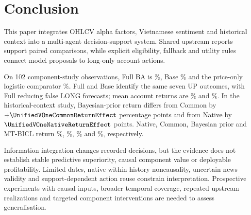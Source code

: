 \section{Conclusion}
\label{sec:conclusion}

This paper integrates OHLCV alpha factors, Vietnamese sentiment and historical context into a multi-agent decision-support system. Shared upstream reports support paired comparisons, while explicit eligibility, fallback and utility rules connect model proposals to long-only account actions.

On 102 component-study observations, Full BA is \FullBA\%, Base \BaseBA\% and the price-only logistic comparator \LogisticPriceBA\%. Full and Base identify the same seven UP outcomes, with Full reducing false LONG forecasts; mean account returns are \FullReturn\% and \BaseReturn\%. In the historical-context study, Bayesian-prior return differs from Common by $+\UnifiedVOneCommonReturnEffect$ percentage points and from Native by $\UnifiedVOneNativeReturnEffect$ points. Native, Common, Bayesian prior and MT-BICL return \UnifiedNativeReturn\%, \UnifiedCommonReturn\%, \UnifiedVOneReturn\% and \UnifiedMTReturn\%, respectively.

Information integration changes recorded decisions, but the evidence does not establish stable predictive superiority, causal component value or deployable profitability. Limited dates, native within-history noncausality, uncertain news validity and support-dependent action reuse constrain interpretation. Prospective experiments with causal inputs, broader temporal coverage, repeated upstream realizations and targeted component interventions are needed to assess generalisation.
